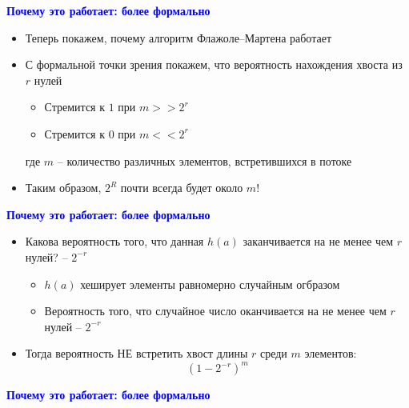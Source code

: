 \documentclass[landscape]{slides}
\begin{document}
\begin{normalsize}
\begin{slide}
\textbf{\textcolor{blue}{Почему это работает: более формально}}

\begin{itemize}
\item Теперь покажем, почему алгоритм Флажоле--Мартена работает
\item С формальной точки зрения покажем, что вероятность нахождения хвоста из $r$ нулей
  \begin{itemize}
  \item Стремится к $1$ при $m>>2^r$
  \item Стремится к $0$ при $m<<2^r$
  \end{itemize}
  где $m$ -- количество различных элементов, встретившихся в потоке
\item Таким образом, $2^R$ почти всегда будет около $m$!
\end{itemize}
\end{slide}


\begin{slide}
\textbf{\textcolor{blue}{Почему это работает: более формально}}

\begin{itemize}
\item Какова вероятность того, что данная $h(a)$ заканчивается на не менее чем $r$ нулей? -- $2^{-r}$
  \begin{itemize}
  \item $h(a)$ хеширует элементы равномерно случайным огбразом
  \item Вероятность того, что случайное число оканчивается на не менее чем $r$ нулей -- $2^{-r}$
  \end{itemize}
\item Тогда вероятность НЕ встретить хвост длины $r$ среди $m$ элементов:
$$ (1-2^{-r})^m $$
\end{itemize}
\end{slide}


\begin{slide}
\textbf{\textcolor{blue}{Почему это работает: более формально}}


\end{slide}
\end{normalsize}
\end{document}
